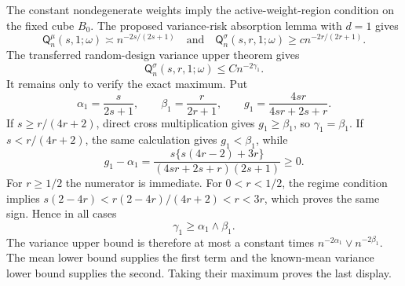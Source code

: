 The constant nondegenerate weights imply the active-weight-region condition on the fixed cube \(B_0\).  The proposed variance-risk absorption lemma with \(d=1\) gives
\[
\mathsf Q_n^{\mu}(s,1;\omega)\asymp n^{-2s/(2s+1)}
\quad\text{and}\quad
\mathsf Q_n^{\sigma}(s,r,1;\omega)\geq c n^{-2r/(2r+1)}.
\]
The transferred random-design variance upper theorem gives
\[
\mathsf Q_n^{\sigma}(s,r,1;\omega)\leq Cn^{-2\gamma_1}.
\]
It remains only to verify the exact maximum.  Put
\[
\alpha_1=\frac{s}{2s+1},\qquad
\beta_1=\frac{r}{2r+1},\qquad
g_1=\frac{4sr}{4sr+2s+r}.
\]
If \(s\geq r/(4r+2)\), direct cross multiplication gives \(g_1\geq\beta_1\), so \(\gamma_1=\beta_1\).  If \(s<r/(4r+2)\), the same calculation gives \(g_1<\beta_1\), while
\[
g_1-\alpha_1
=\frac{s\{s(4r-2)+3r\}}{(4sr+2s+r)(2s+1)}\geq0.
\]
For \(r\geq1/2\) the numerator is immediate.  For \(0<r<1/2\), the regime condition implies
\(s(2-4r)<r(2-4r)/(4r+2)<r<3r\), which proves the same sign.  Hence in all cases
\[
\gamma_1\geq\alpha_1\wedge\beta_1.
\]
The variance upper bound is therefore at most a constant times
\(n^{-2\alpha_1}\vee n^{-2\beta_1}\).  The mean lower bound supplies the first term and the known-mean variance lower bound supplies the second.  Taking their maximum proves the last display.